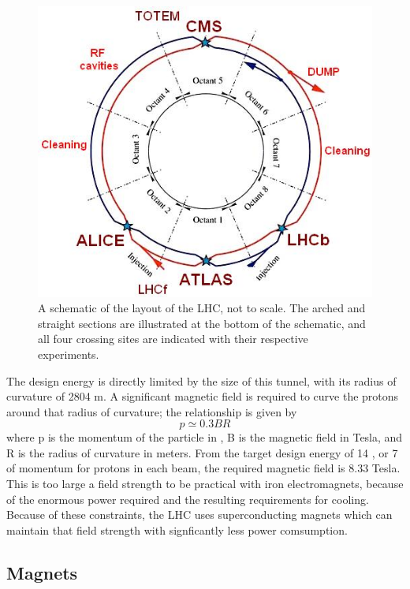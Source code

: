 \begin{figure}
\includegraphics[width=\fullfig]{figures/lhc_schematic.jpg}
\caption{A schematic of the layout of the \ac{LHC}, not to scale. The arched and straight sections are illustrated at the bottom of the schematic, and all four crossing sites are indicated with their respective experiments.}
\label{fig:lhc_schematic}
\end{figure}

The design energy is directly limited by the size of this tunnel, with its radius of curvature of 2804 m. 
A significant magnetic field is required to curve the protons around that radius of curvature; the relationship is given by
\[ p \simeq 0.3BR\]
where p is the momentum of the particle in \GeV, B is the magnetic field in Tesla, and R is the radius of curvature in meters. 
From the target design energy of 14 \TeV, or 7 \TeV of momentum for protons in each beam, the required magnetic field is 8.33 Tesla.
This is too large a field strength to be practical with iron electromagnets, because of the enormous power required and the resulting requirements for cooling.
Because of these constraints, the \ac{LHC} uses superconducting magnets which can maintain that field strength with signficantly less power comsumption.

\subsection{Magnets}

